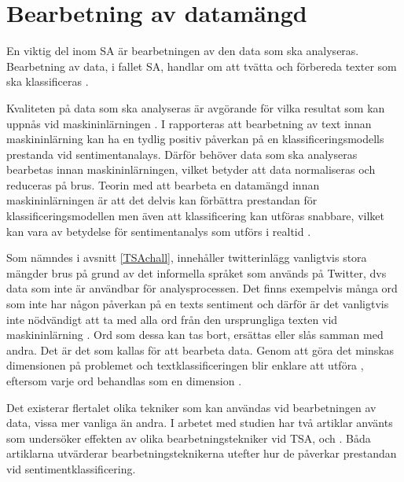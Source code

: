 \documentclass{kaumasters} %
\begin{document}
\section{Bearbetning av datamängd} \label{exp:pre}
En viktig del inom SA är bearbetningen av den data som ska analyseras. Bearbetning av data, i fallet SA, handlar om att tvätta och förbereda texter som ska klassificeras \cite{effrosynidis2017comparison}. 

Kvaliteten på data som ska analyseras är avgörande för vilka resultat som kan uppnås vid maskininlärningen \cite{effrosynidis2017comparison}. I \cite{HADDI201326} rapporteras att bearbetning av text innan maskininlärning kan ha en tydlig positiv påverkan på en klassificeringsmodells prestanda vid sentimentanalays. Därför behöver data som ska analyseras bearbetas innan maskininlärningen, vilket betyder att data normaliseras och reduceras på brus. Teorin med att bearbeta en datamängd innan maskininlärningen är att det delvis kan förbättra prestandan för klassificeringsmodellen men även att klassificering kan utföras snabbare, vilket kan vara av betydelse för sentimentanalys som utförs i realtid \cite{7862202}. 

Som nämndes i avsnitt \ref{TSAchall}, innehåller twitterinlägg vanligtvis stora mängder brus på grund av det informella språket som används på Twitter, dvs data som inte är användbar för analysprocessen. Det finns exempelvis många ord som inte har någon påverkan på en texts sentiment och därför är det vanligtvis inte nödvändigt att ta med alla ord från den ursprungliga texten vid maskininlärning \cite{effrosynidis2017comparison, HADDI201326}. Ord som dessa kan tas bort, ersättas eller slås samman med andra. Det är det som kallas för att bearbeta data. Genom att göra det minskas dimensionen på problemet och textklassificeringen blir enklare att utföra , eftersom varje ord behandlas som en dimension \cite{HADDI201326}. 

Det existerar flertalet olika tekniker som kan användas vid bearbetningen av data, vissa mer vanliga än andra. I arbetet med studien har två artiklar använts som undersöker effekten av olika bearbetningstekniker vid TSA, \cite{effrosynidis2017comparison} och \cite{7862202}. Båda artiklarna utvärderar bearbetningsteknikerna utefter hur de påverkar prestandan vid sentimentklassificering.
\end{document}

